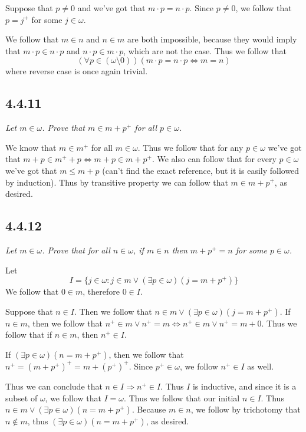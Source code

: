 \documentclass[11pt,oneside,titlepage]{book}
\DeclareMathOperator \lra {\Leftrightarrow}
\DeclareMathOperator \ra {\Rightarrow}
\begin{document}
Suppose that $p \neq 0$ and we've got that $m \cdot p = n \cdot p$. Since $p \neq 0$, we
follow that $p = j^+$ for some $j \in \omega$.

We follow that $m \in n$ and $n \in m$ are both impossible, because they would imply
that $m \cdot p \in n \cdot p$ and $n \cdot p \in m \cdot p$, which are not the case. Thus
we follow that
$$(\forall p \in (\omega \setminus 0))(m \cdot p = n \cdot p \lra m = n)$$
where reverse case is once again trivial.

\subsection*{4.4.11}

\textit{Let $m \in \omega$. Prove that $m \in m + p^+$ for all $p \in \omega$.}

We know that $m \in m^+$ for all $m \in \omega$. Thus we follow that for any $p \in \omega$
we've got that $m + p \in m^+ + p \lra m + p \in m + p^+$. We also can follow that
for every $p \in \omega$ we've got that $m \leq m + p$ (can't find the exact reference,
but it is easily followed by induction). Thus by transitive property we can follow
that  $m \in m + p^+$, as desired.

\subsection*{4.4.12}

\textit{Let $m \in \omega$. Prove that for all $n \in \omega$, if $m \in n$ then
  $m + p^+ = n$ for some $p \in \omega$.}

Let
$$I = \{j \in \omega: j \in m \lor (\exists p \in \omega)(j = m + p^+) \}$$
We follow that $0 \in m$, therefore $0 \in I$.

Suppose that $n \in I$. Then we follow that $n \in m \lor (\exists p \in \omega) (j = m + p^+)$.
If $n \in m$, then we follow that $n^+ \in m \lor n^+ = m \lra
n^+ \in m \lor n^+ = m + 0 $. Thus we follow that if $n \in m$, then $n^+ \in I$.

If $(\exists p \in \omega)(n = m + p^+)$, then we follow that $n^+ = (m + p^+)^+ = m + (p^+)^+$.
Since $p^+ \in \omega$, we follow $n^+ \in I$ as well.

Thus we can conclude that $n \in I \ra n^+ \in I$. Thus $I$ is inductive, and since it is
a subset of $\omega$, we follow that $I = \omega$. Thus we follow that our initial $n \in I$.
Thus $n \in m \lor (\exists p \in \omega)(n = m + p^+)$. Because $m \in n$, we follow
by trichotomy that $n \notin m$, thus $ (\exists p \in \omega)(n = m + p^+)$, as desired.
\end{document}
